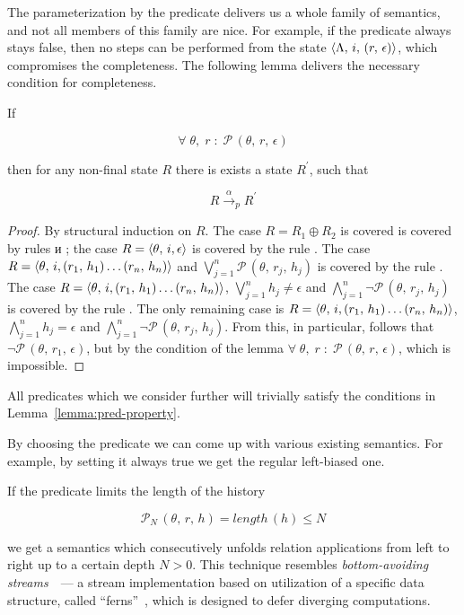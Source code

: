 The parameterization by the predicate delivers us a whole family of semantics, and not all members of this family are nice. For example,
if the predicate always stays false, then no steps can be performed from the state $\langle \Lambda,\, i, \, (r,\, \epsilon) \rangle$, which compromises the completeness.
The following lemma delivers the necessary condition for completeness.

\begin{lemma}
\label{lemma:pred-property}
If

\[
\forall\;\theta,\;r\; :\;\mathcal{P}\,(\theta,\, r,\, \epsilon)
\]

then for any non-final state $R$ there is exists a state $R^\prime$, such that

\[
R \xrightarrow{\alpha}_p R^\prime
\]
\end{lemma}
\begin{proof}
  By structural induction on $R$. The case $R = R_1 \oplus R_2$ is covered is covered by rules  и ; the case $R = \langle \theta,\, i, \epsilon \rangle$ is
  covered by the rule . The case $R = \langle \theta,\, i, (r_1,\,h_1) \dots (r_n,\,h_n) \rangle$ and $\bigvee_{j=1}^n \mathcal{P}\,(\theta,\, r_j,\, h_j)$ is covered by the
  rule . The case $R = \langle \theta,\, i, (r_1,\,h_1) \ldots (r_n,\,h_n) \rangle$,  $\bigvee_{j=1}^n h_j \not= \epsilon$ and $\bigwedge_{j=1}^n \neg\mathcal{P}\,(\theta,\,r_j,\,h_j)$
  is covered by the rule . The only remaining case is $R = \langle \theta,\, i, (r_1,\,h_1) \ldots (r_n,\,h_n) \rangle$, $\bigwedge_{j=1}^n h_j= \epsilon$ and
  $\bigwedge_{j=1}^n \neg\mathcal{P}\,(\theta,\,r_j,\,h_j)$. From this, in particular, follows that $\neg\mathcal{P}\,(\theta,\,r_1,\,\epsilon)$, but by the condition of the lemma
  $\forall\;\theta,\;r\; :\;\mathcal{P}\,(\theta,\, r,\, \epsilon)$, which is impossible.
\end{proof}

All predicates which we consider further will trivially satisfy the conditions in Lemma~\ref{lemma:pred-property}.

By choosing the predicate we can come up with various existing semantics. For example, by setting it always true we get the regular left-biased one.

If the predicate limits the length of the history

\[
\mathcal{P}_N\,(\theta,\, r,\, h) = length\,(h) \leq N
\]

we get a semantics which consecutively unfolds relation applications from left to right up to a certain depth $N>0$. This technique resembles \emph{bottom-avoiding
streams}~\cite{fair:WillThesis}~--- a stream implementation based on utilization of a specific data structure, called ``ferns''~\cite{fair:ferns}, which is designed
to defer diverging computations.

